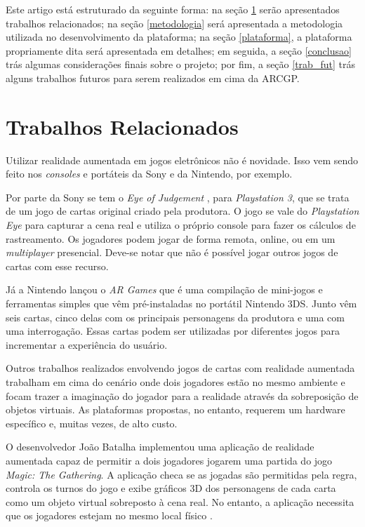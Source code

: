 \documentclass[conference]{IEEEtran}
\begin{document}
Este artigo está estruturado da seguinte forma: na seção \ref{rel} serão 
apresentados trabalhos relacionados; na seção \ref{metodologia} será 
apresentada a metodologia utilizada no desenvolvimento da plataforma; na 
seção \ref{plataforma}, a plataforma propriamente dita será apresentada em 
detalhes; em seguida, a seção \ref{conclusao} trás algumas considerações finais 
sobre o projeto; por fim, a seção \ref{trab_fut} trás alguns trabalhos futuros 
para serem realizados em cima da ARCGP.

\section{Trabalhos Relacionados}
\label{rel}
Utilizar realidade aumentada em jogos eletrônicos não é novidade. Isso vem sendo 
feito nos \textit{consoles} e portáteis da Sony e da Nintendo, por exemplo.

Por parte da Sony se tem o \textit{Eye of Judgement} \cite{eyesony}, para 
\textit{Playstation 3}, que se trata de um jogo de cartas original criado pela 
produtora. O jogo se vale do \textit{Playstation Eye} para capturar a cena real 
e utiliza o próprio console para fazer os cálculos de rastreamento. Os jogadores 
podem jogar de forma remota, online, ou em um \textit{multiplayer} presencial. 
Deve-se notar que não é possível jogar outros jogos de cartas com esse recurso.

Já a Nintendo lançou o \textit{AR Games} \cite{3ds} que é uma compilação de 
mini-jogos e ferramentas simples que vêm pré-instaladas no portátil Nintendo 
3DS. Junto vêm seis cartas, cinco delas com os principais personagens da 
produtora e uma com uma interrogação. Essas cartas podem ser utilizadas por 
diferentes jogos para incrementar a experiência do usuário.

Outros trabalhos realizados envolvendo jogos de cartas com realidade aumentada 
trabalham em cima do cenário onde dois jogadores estão no mesmo ambiente e focam 
trazer a imaginação do jogador para a realidade através da sobreposição de 
objetos virtuais. As plataformas propostas, no entanto, requerem um hardware 
específico e, muitas vezes, de alto custo.

O desenvolvedor João Batalha implementou uma aplicação de realidade aumentada 
capaz de permitir a dois jogadores jogarem uma partida do jogo \textit{Magic: 
The Gathering}. A aplicação checa se as jogadas são permitidas pela regra, 
controla os turnos do jogo e exibe gráficos 3D dos personagens de cada carta 
como um objeto virtual sobreposto à cena real. No entanto, a aplicação necessita 
que os jogadores estejam no mesmo local físico \cite{joao}.
\end{document}
